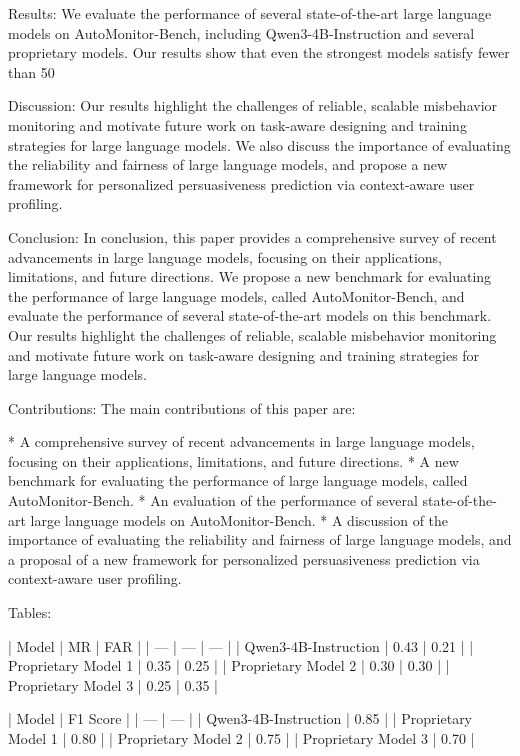Results:
We evaluate the performance of several state-of-the-art large language models on AutoMonitor-Bench, including Qwen3-4B-Instruction and several proprietary models. Our results show that even the strongest models satisfy fewer than 50%

Discussion:
Our results highlight the challenges of reliable, scalable misbehavior monitoring and motivate future work on task-aware designing and training strategies for large language models. We also discuss the importance of evaluating the reliability and fairness of large language models, and propose a new framework for personalized persuasiveness prediction via context-aware user profiling.

Conclusion:
In conclusion, this paper provides a comprehensive survey of recent advancements in large language models, focusing on their applications, limitations, and future directions. We propose a new benchmark for evaluating the performance of large language models, called AutoMonitor-Bench, and evaluate the performance of several state-of-the-art models on this benchmark. Our results highlight the challenges of reliable, scalable misbehavior monitoring and motivate future work on task-aware designing and training strategies for large language models.

Contributions:
The main contributions of this paper are:

* A comprehensive survey of recent advancements in large language models, focusing on their applications, limitations, and future directions.
* A new benchmark for evaluating the performance of large language models, called AutoMonitor-Bench.
* An evaluation of the performance of several state-of-the-art large language models on AutoMonitor-Bench.
* A discussion of the importance of evaluating the reliability and fairness of large language models, and a proposal of a new framework for personalized persuasiveness prediction via context-aware user profiling.

Tables:

| Model | MR | FAR |
| --- | --- | --- |
| Qwen3-4B-Instruction | 0.43 | 0.21 |
| Proprietary Model 1 | 0.35 | 0.25 |
| Proprietary Model 2 | 0.30 | 0.30 |
| Proprietary Model 3 | 0.25 | 0.35 |

| Model | F1 Score |
| --- | --- |
| Qwen3-4B-Instruction | 0.85 |
| Proprietary Model 1 | 0.80 |
| Proprietary Model 2 | 0.75 |
| Proprietary Model 3 | 0.70 |

